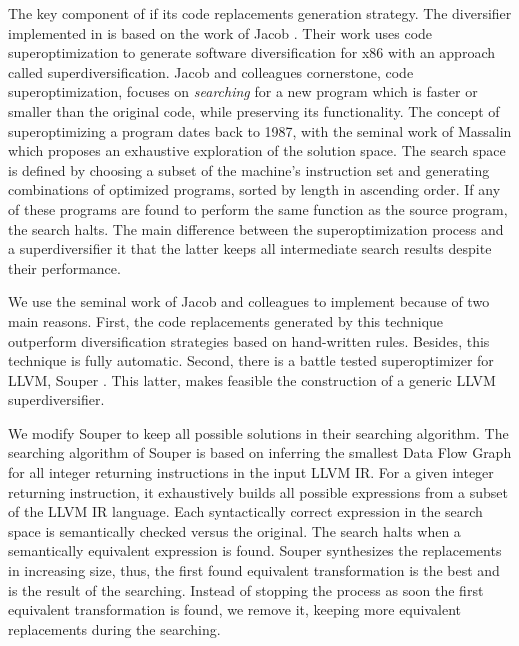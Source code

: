 
The key component of if its code replacements generation strategy. The diversifier implemented in is based on the work of Jacob \etal \cite{jacob2008superdiversifier}. Their work uses code superoptimization to generate software diversification for x86 with an approach called superdiversification. 
Jacob and colleagues cornerstone, code superoptimization, focuses on \emph{searching} for a new program which is faster or smaller than the original code, while preserving its functionality.
The concept of superoptimizing a program dates back to 1987, with the seminal work of Massalin \cite{Massalin1987} which proposes an exhaustive exploration of the solution space. The search space is defined by choosing a subset of the machine's instruction set and generating combinations of optimized programs, sorted by length in ascending order. If any of these programs are found to perform the same function as the source program, the search halts. The main difference between the superoptimization process and a superdiversifier it that the latter keeps all intermediate search results despite their performance. 

We use the seminal work of Jacob and colleagues to implement because of two main reasons.
First, the code replacements generated by this technique outperform diversification strategies based on hand-written rules. Besides, this technique is fully automatic.
Second, there is a battle tested superoptimizer for LLVM, Souper \cite{Sasnauskas2017Souper:Superoptimizer}. This latter, makes feasible the construction of a generic LLVM superdiversifier.

We modify Souper to keep all possible solutions in their searching algorithm. The searching algorithm of Souper is based on inferring the smallest Data Flow Graph for all integer returning instructions in the input LLVM IR. For a given integer returning instruction, it exhaustively builds all possible expressions from a subset of the LLVM IR language.
Each syntactically correct expression in the search space is semantically checked versus the original. The search halts when a semantically equivalent expression is found. Souper synthesizes the replacements in increasing size, thus, the first found equivalent transformation is the best and is the result of the searching. Instead of stopping the process as soon the first equivalent transformation is found, we remove it, keeping more equivalent replacements during the searching. 

